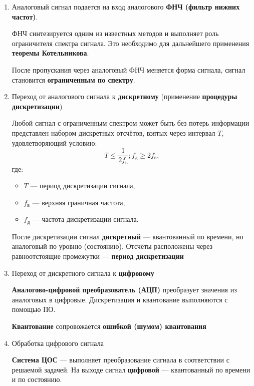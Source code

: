 \documentclass[a4paper, 14pt]{extarticle}
\begin{document}
\begin{enumerate}
    \item Аналоговый сигнал подается на вход аналогового \textbf{ФНЧ (фильтр нижних частот)}.

        ФНЧ синтезируется одним из известных методов и выполняет роль ограничителя спектра сигнала. Это необходимо для дальнейшего применения \textbf{теоремы Котельникова}.

        После пропускания через аналоговый ФНЧ меняется форма сигнала, сигнал становится \textbf{ограниченным по спектру}.
    \item Переход от аналогового сигнала к \textbf{дискретному} (применение \textbf{процедуры дискретизации})
        \begin{tcolorbox}[title=Теорема Котельникова]
            Любой сигнал с ограниченным спектром может быть без потерь информации представлен набором дискретных отсчётов, взятых через интервал $T$, удовлетворяющий условию:
            \begin{equation*}
                T \le \frac{1}{2f_\text{в}}; f_\text{д} \ge 2f_\text{в}, 
            \end{equation*}
            где:
            \begin{itemize}
                \item $T$ --- период дискретизации сигнала,
                \item $f_\text{в} $ --- верхняя граничная частота,
                \item $f_\text{д}$ --- частота дискретизации сигнала.
            \end{itemize}

            После дискретизации сигнал \textbf{дискретный} --- квантованный по времени, но аналоговый по уровню (состоянию). Отсчёты расположены через равноотстоящие промежутки --- \textbf{период дискретизации}

        \end{tcolorbox}
    \item Переход от дискретного сигнала к \textbf{цифровому}

        \textbf{Аналогово-цифровой преобразователь (АЦП)} преобразует значения из аналоговых в цифровые. Дискретизация и квантование выполняются с помощью ПО.

        \textbf{Квантование} сопровожается \textbf{ошибкой (шумом) квантования} 
    \item Обработка цифрового сигнала

        \textbf{Система ЦОС} --- выполняет преобразование сигнала в соответствии с решаемой задачей. На выходе сигнал \textbf{цифровой} --- квантованный по времени и по состоянию.



\end{enumerate}
\end{document}
